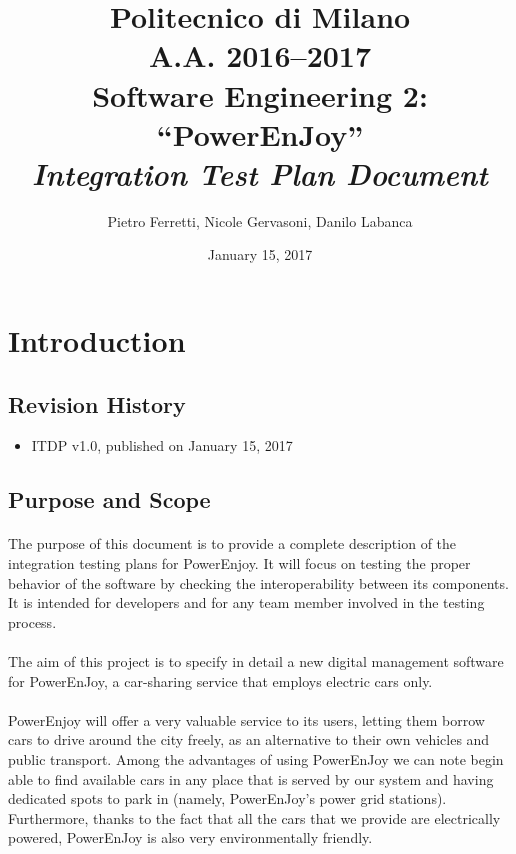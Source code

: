 \documentclass[english]{article}
\begin{document}
\title{Politecnico di Milano\\
 A.A. 2016–2017 \\
Software Engineering 2: “PowerEnJoy” \\
\emph{Integration Test Plan Document}}

\author{Pietro Ferretti, Nicole Gervasoni, Danilo Labanca}
\date{January 15, 2017}
\maketitle

\newpage

\tableofcontents{}

\newpage

\section{Introduction}

\subsection{Revision History}
\begin{itemize}
	\item{ITDP v1.0, published on January 15, 2017}
\end{itemize}
\subsection{Purpose and Scope}

\paragraph{}
The purpose of this document is to provide a complete description of the integration testing plans for PowerEnjoy. It will focus on testing the proper behavior of the software by checking the
interoperability between its components.
It is intended for developers and for any team member involved in the testing process.

\paragraph{}
The aim of this project is to specify in detail a new digital management software for PowerEnJoy, a car-sharing service that employs electric cars only.

\paragraph{}
PowerEnjoy will offer a very valuable service to its users, letting them borrow cars to drive around the city freely, as an alternative to their own vehicles and public transport.
Among the advantages of using PowerEnJoy we can note begin able to find available cars in any place that is served by our system and having dedicated spots to park in (namely, PowerEnJoy's power grid stations).
Furthermore, thanks to the fact that all the cars that we provide are electrically powered, PowerEnJoy is also very environmentally friendly.
\end{document}
